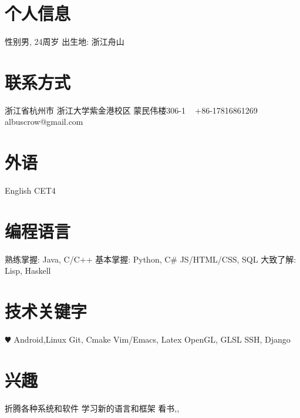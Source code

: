 \documentclass[]{friggeri-cv} %
\begin{document}


\begin{aside} %
\section{个人信息}
性别男, 24周岁
出生地: 浙江舟山
\section{联系方式}
浙江省杭州市
浙江大学紫金港校区
蒙民伟楼306-1
~
+86-17816861269
albuscrow@gmail.com
\section{外语}
English CET4
\section{编程语言}
熟练掌握: Java, C/C++
基本掌握: Python, C\# JS/HTML/CSS, SQL
大致了解: Lisp, Haskell
\section{技术关键字}
{\color{red} $\varheartsuit$} Android,Linux
Git, Cmake
Vim/Emacs, Latex
OpenGL, GLSL
SSH, Django
\section{兴趣}
折腾各种系统和软件
学习新的语言和框架
看书,,
\end{aside}

\end{document}
